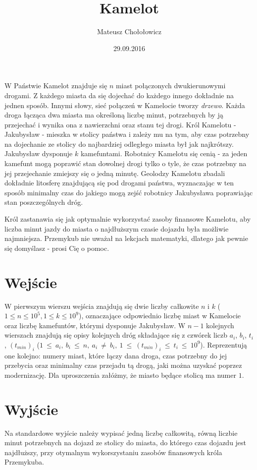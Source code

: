 \documentclass[zad,zawodnik,utf8]{sinol}
\title{Kamelot}
\author{Mateusz Chołołowicz} %
\date{29.09.2016}
\begin{document}
  \begin{tasktext}%

  W Państwie Kamelot znajduje się $n$ miast połączonych dwukierunowymi drogami. Z każdego miasta da się dojechać do każdego innego dokładnie na jednen sposób. 
  Innymi słowy, sieć połączeń w Kamelocie tworzy \textit{drzewo}. Każda droga łącząca dwa miasta ma określoną liczbę minut, potrzebnych by ją przejechać i wynika ona 
  z nawierzchni oraz stanu tej drogi. Król Kamelotu - Jakubysław - mieszka w stolicy państwa i zależy mu na tym, aby czas potrzebny na dojechanie ze stolicy do najbardziej 
  odległego miasta był jak najkrótszy. Jakubysław dysponuje $k$ kamefuntami. Robotnicy Kamelotu się cenią - za jeden kamefunt mogą poprawić stan dowolnej drogi tylko o tyle, 
  że czas potrzebny na jej przejechanie zmiejszy się o jedną minutę. Geolodzy Kamelotu zbadali dokładnie litosferę znajdującą się pod drogami państwa, wyznaczając w ten
  sposób minimalny czas do jakiego mogą zejść robotnicy Jakubysława poprawiając stan poszczególnych dróg. 
  
  Król zastanawia się jak optymalnie wykorzystać zasoby finansowe Kamelotu, aby liczba minut jazdy do miasta o najdłuższym czasie dojazdu była możliwie najmniejsza. 
  Przemykub nie uważał na lekcjach matematyki, dlatego jak pewnie się domyślasz - prosi Cię o pomoc. 
  
 \section{Wejście}
    
W pierwszym wierszu wejścia znajdują się dwie liczby całkowite $n$ i $k$ ($1 \leq n \leq 10^5, 1 \leq k \leq 10^9$), oznaczające odpowiednio liczbę miast w Kamelocie
oraz liczbę kamefuntów, którymi dysponuje Jakubysław. W $n-1$ kolejnych wierszach znajdują się opisy kolejnych dróg składające się z czwórek liczb 
$a_i$, $b_i$, $t_i$, $(t_{min})_i$ ($1~\leq~a_i,~b_i~\leq~n,~a_i~\neq~b_i,~1~\leq~(t_{min})_i~\leq~t_i~\leq~10^9$). Reprezentują one kolejno: numery miast, które łączy
dana droga, czas potrzebny do jej przebycia oraz minimalny czas przejadu tą drogą, jaki można uzyskać poprzez modernizację. Dla uproszczenia załóżmy, że miasto będące
stolicą ma numer $1$.


  \section{Wyjście}
    Na standardowe wyjście należy wypisać jedną liczbę całkowitą, równą liczbie minut potrzebnych na dojazd ze stolicy do miasta, do którego czas dojazdu jest najdłuższy,
    przy otymalnym wykorszystaniu zasobów finansowych króla Przemykuba.
    
    
    \makecompactexample

  \end{tasktext}
\end{document}
